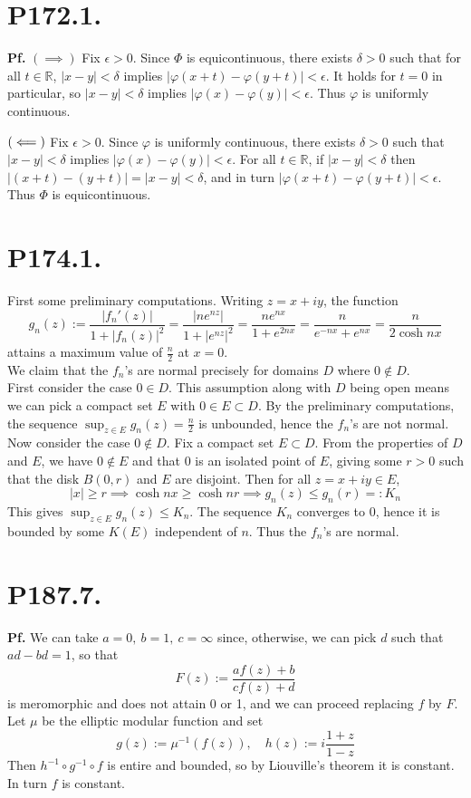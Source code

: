 \documentclass{article}
\def\mbb#1{\mathbb{#1}}
\def\tbf#1{\textbf{#1}}
\def\bR{\mbb{R}}
\renewcommand{\ss}{\subset}
\newcommand{\ep}{\epsilon}
\newcommand{\vp}{\varphi}
\newcommand{\inv}{^{-1}}
\newcommand{\pf}{\tbf{Pf. }}
\newcommand{\imp}{\implies}
\newcommand{\impleft}{\reflectbox{$\implies$}}
\begin{document}
\section*{P172.1.}
\pf $(\imp)$ Fix $\ep>0$. Since $\Phi$ is equicontinuous, there exists $\delta>0$ such that for all $t\in\bR$, $|x-y|<\delta$ implies $|\vp(x+t)-\vp(y+t)|<\ep$. It holds for $t=0$ in particular, so $|x-y|<\delta$ implies $|\vp(x)-\vp(y)|<\ep$. Thus $\vp$ is uniformly continuous.

$(\impleft)$ Fix $\ep>0$. Since $\vp$ is uniformly continuous, there exists $\delta>0$ such that $|x-y|<\delta$ implies $|\vp(x)-\vp(y)|<\ep$. For all $t\in\bR$, if $|x-y|<\delta$ then $|(x+t)-(y+t)|=|x-y|<\delta$, and in turn $|\vp(x+t)-\vp(y+t)|<\ep$. Thus $\Phi$ is equicontinuous.



\section*{P174.1.}
First some preliminary computations. Writing $z=x+iy$, the function
$$g_n(z) := \frac{|f_n'(z)|}{1+|f_n(z)|^2}
= \frac{|ne^{nz}|}{1+|e^{nz}|^2}
= \frac{ne^{nx}}{1+e^{2nx}}
= \frac{n}{e^{-nx}+e^{nx}}
= \frac{n}{2\cosh nx}$$
attains a maximum value of $\frac n2$ at $x=0$.\\

We claim that the $f_n$'s are normal precisely for domains $D$ where $0\notin D$.\\

First consider the case $0\in D$. This assumption along with $D$ being open means we can pick a compact set $E$ with $0\in E\ss D$. By the preliminary computations, the sequence $\sup_{z\in E}g_n(z)=\frac n2$ is unbounded, hence the $f_n$'s are not normal.\\

Now consider the case $0\notin D$. Fix a compact set $E\ss D$. From the properties of $D$ and $E$, we have $0\notin E$ and that 0 is an isolated point of $E$, giving some $r>0$ such that the disk $B(0,r)$ and $E$ are disjoint. Then for all $z=x+iy\in E$,
$$|x| \ge r
\imp \cosh nx \ge \cosh nr
\imp g_n(z) \le g_n(r) =: K_n$$
This gives $\sup_{z\in E}g_n(z) \le K_n$. The sequence $K_n$ converges to 0, hence it is bounded by some $K(E)$ independent of $n$. Thus the $f_n$'s are normal.



\section*{P187.7.}
\pf We can take $a=0,~b=1,~c=\infty$ since, otherwise, we can pick $d$ such that $ad-bd=1$, so that
$$F(z) := \frac{af(z)+b}{cf(z)+d}$$
is meromorphic and does not attain 0 or 1, and we can proceed replacing $f$ by $F$.\\

Let $\mu$ be the elliptic modular function and set
$$g(z) := \mu\inv(f(z)),
\quad h(z) := i\frac{1+z}{1-z}$$
Then $h\inv\circ g\inv\circ f$ is entire and bounded, so by Liouville's theorem it is constant. In turn $f$ is constant.
	
\end{document}

